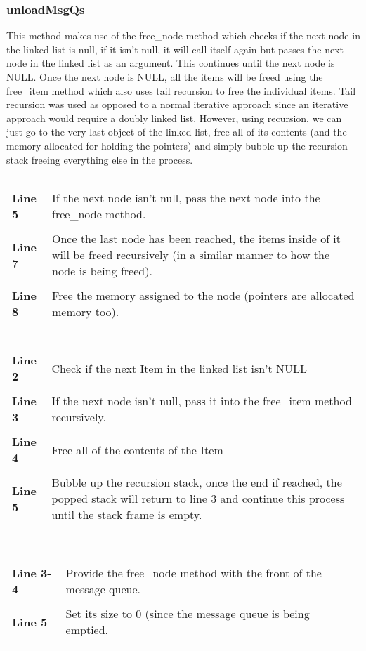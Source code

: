 \documentclass[a4paper, 12pt, titlepage]{article}
\newenvironment{code}{\captionsetup{type=listing}}{}
\newcommand{\sourcecode}[3]{
    \begin{code}
      \inputminted[linenos,numbersep=5pt,gobble=0,frame=lines,framesep=2mm,]{c}{#1}
        \caption{#2}
        \label{lst: #3}
    \end{code}
  }
\newcommand{\explainline}[2]{
  \textbf{Line #1} & #2 \\ \\
}
\begin{document}
\begin{onehalfspacing}
\clearpage
    \subsubsection{unloadMsgQs}
  This method makes use of the free\_node method which checks if the next node in the linked list is null, if it isn't null, it will call itself again but passes the next node in the linked list as an argument. This continues until the next node is NULL. Once the next node is NULL, all the items will be freed using the free\_item method which also uses tail recursion to free the individual items. Tail recursion was used as opposed to a normal iterative approach since an iterative approach would require a doubly linked list. However, using recursion, we can just go to the very last object of the linked list, free all of its contents (and the memory allocated for holding the pointers) and simply bubble up the recursion stack freeing everything else in the process.

  \sourcecode{snippets/task2b/free_node.c}{free\_node implementation}{free_node}
  \begin{longtable}{l p{10cm}}
    \explainline{5}{If the next node isn't null, pass the next node into the free\_node method.}
    \explainline{7}{Once the last node has been reached, the items inside of it will be freed recursively (in a similar manner to how the node is being freed).}
    \explainline{8}{Free the memory assigned to the node (pointers are allocated memory too).}
  \end{longtable}

  \clearpage

  \sourcecode{snippets/task2b/free_item.c}{free\_item implementation}{free_item}
  \begin{longtable}{l p{10cm}}
    \explainline{2}{Check if the next Item in the linked list isn't NULL}
    \explainline{3}{If the next node isn't null, pass it into the free\_item method recursively.}
    \explainline{4}{Free all of the contents of the Item}
    \explainline{5}{Bubble up the recursion stack, once the end if reached, the popped stack will return to line 3 and continue this process until the stack frame is empty.}
  \end{longtable}

  \clearpage

  \sourcecode{snippets/task2b/free_individual_item.c}{free\_individual\_item implementation}{free_ind_item}
  \sourcecode{snippets/task2b/unloadMsgQs.c}{unloadMsgQs method implementation}{unloadMsgQs}
  \begin{longtable}{l p{10cm}}
    \explainline{3-4}{Provide the free\_node method with the front of the message queue.}
    \explainline{5}{Set its size to 0 (since the message queue is being emptied.}
  \end{longtable}


\end{onehalfspacing}
\end{document}
